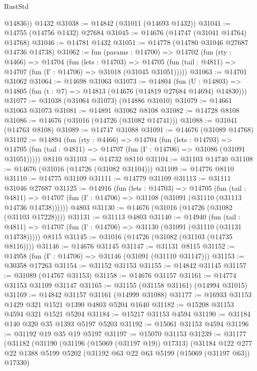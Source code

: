 \begin{lexlean}{RustStd}
\begin{coremodule}
        @14836))
    @1432
@31038 := @14842 (@31011 (@14693 @1432))
@31041 := @14755 (@14756 @1432) @27684
@31045 := @14676 (@14747 (@31041 @14764) @14768)
@31046 := @14781 @1432
@31051 := @14778 (@14780 @31046 @27687 @14736 @14738)
@31062 := fun (params : @14700) =>
  @14702
    (fun (rty : @4466) =>
    @14704
      (fun (lets : @14703) =>
      @14705 (fun (tail : @4811) => @14707 (fun (Γ : @14706) => @31018 (@31045 @31051)))))
@31063 := @14701 @31062
@31064 := @14698 @31063
@31073 := @14804
    (fun (U : @14803) => @14805 (fun (t : @7) => @14813 (@14676 (@14819 @27684 @14694) @14830)))
@31077 := @31038 (@31064 @31073) (@14886 @31010)
@31079 := @14661 @31063 @31073
@31081 := @14891 @31062 @8108
@31082 := @14728 @8108
@31086 := @14676 (@31016 (@14726 (@31082 @14741)))
@31088 := @31041 (@14763 @8108)
@31089 := @14747 @31088
@31091 := @14676 (@31089 @14768)
@31102 := @14894
    (fun (rty : @4466) =>
    @14704
      (fun (lets : @14703) =>
      @14705 (fun (tail : @4811) => @14707 (fun (Γ : @14706) => @31086 (@31091 @31051)))))
    @8110
@31103 := @14732 @8110
@31104 := @31103 @14740
@31108 := @14676 (@31016 (@14726 (@31082 @31104)))
@31109 := @14776 @8110
@31110 := @14775 @31109
@31111 := @14779 @31109
@31113 := @31111 @31046 @27687
@31125 := @14916
    (fun (lets : @14703) =>
    @14705
      (fun (tail : @4811) =>
      @14707 (fun (Γ : @14706) => @31108 (@31091 (@31110 (@31113 @14736 @14738))))))
    @4803
@31130 := @14676 (@31016 (@14726 (@31082 (@31103 @17228))))
@31131 := @31113 @4803
@31140 := @14940
    (fun (tail : @4811) => @14707 (fun (Γ : @14706) => @31130 (@31091 (@31110 (@31131 @14738)))))
    @8115
@31145 := @31016 (@14726 (@31082 (@31103 (@14735 @8116))))
@31146 := @14676 @31145
@31147 := @31131 @8115
@31152 := @14958 (fun (Γ : @14706) => @31146 (@31091 (@31110 @31147)))
@31153 := @30358 @17263
@31154 := @31152 @31153
@31155 := @14842 @31145
@31157 := @31089 (@14767 @31153)
@31158 := @14676 @31157
@31161 := @14774 @31153 @31109 @31147
@31165 := @31155 (@31158 @31161) (@14994 @31015)
@31169 := @14842 @31157 @31161 (@14999 @31088)
@31177 := @16933 @31153 @1429 @321 @1521 @1390 @4803 @5204 @1640
@31182 := @15208 @31153 @4594 @321 @1521 @5204
@31184 := @15217 @31153 @4594
@31190 := @31184 @140 @320 @35 @1393 @5197 @5203
@31192 := @15061 @31153 @4594
@31196 := @31192 @19 @35 @19 @5197
@31197 := @15070 @31153
@31239 := @31177
    (@31182
      (@31190
        (@31196 (@15069 (@31197 @19)) @17313)
        (@31184
          @122
          @277
          @22
          @1388
          @5199
          @5202
          (@31192 @63 @22 @63 @5199 (@15069 (@31197 @63)) @17330)

\end{coremodule}
\end{lexlean}
